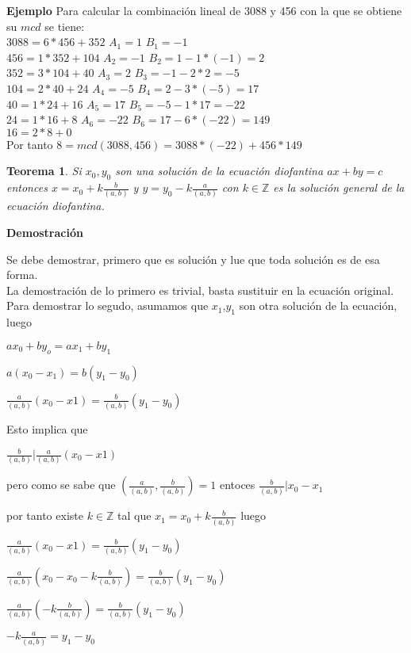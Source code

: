 \documentclass[a4paper,1pt]{report}
\newtheorem*{teo}{Teorema}
\begin{document}
\textbf{Ejemplo}
Para calcular la combinación lineal de 3088 y 456 con la que se obtiene su $mcd$ se tiene:\\
$3088=6*456+352$ $A_1=1$ $B_1=-1$\\
$456=1*352+104$ $A_2=-1$ $B_2=1-1*(-1)=2$\\
$352=3*104+40$ $A_3=2$ $B_3=-1-2*2=-5$\\
$104=2*40+24$ $A_4=-5$ $B_4=2-3*(-5)=17$\\
$40=1*24+16$ $A_5=17$ $B_5=-5-1*17=-22$\\
$24=1*16+8$ $A_6=-22$ $B_6=17-6*(-22)=149$\\
$16=2*8 + 0$\\
Por tanto $8=mcd(3088,456)=3088*(-22)+456*149$

\begin{teo}
 Si $x_0,y_0$ son una solución de la ecuación diofantina $ax+by=c$ entonces 
 $x=x_0+k\frac{b}{(a,b)}$ y $y=y_0-k\frac{a}{(a,b)}$ con $k\in\mathbb{Z}$ es la solución general de la ecuación diofantina.
\end{teo}

\newpage
\textbf{Demostración}

Se debe demostrar, primero que es solución y lue que toda solución es de esa forma.
\\

La demostración de lo primero es trivial, basta sustituir en la ecuación original.
\\

Para demostrar lo segudo, asumamos que $x_1$,$y_1$ son otra solución de la ecuación, luego

$ax_0+by_o=ax_1+by_1$

$a(x_0-x_1)=b(y_1-y_0)$

$\frac{a}{(a,b)}(x_0-x1)=\frac{b}{(a,b)}(y_1-y_0)$

Esto implica que

$\frac{b}{(a,b)}|\frac{a}{(a,b)}(x_0-x1)$

pero como se sabe que $(\frac{a}{(a,b)},\frac{b}{(a,b)})=1$ entoces $\frac{b}{(a,b)}|x_0-x_1$

por tanto existe $k\in\mathbb{Z}$ tal que $x_1=x_0 + k\frac{b}{(a,b)}$ luego

$\frac{a}{(a,b)}(x_0-x1)=\frac{b}{(a,b)}(y_1-y_0)$


$\frac{a}{(a,b)}(x_0- x_0 - k\frac{b}{(a,b)} )=\frac{b}{(a,b)}(y_1-y_0)$

$\frac{a}{(a,b)}(- k\frac{b}{(a,b)} )=\frac{b}{(a,b)}(y_1-y_0)$

$-k\frac{a}{(a,b)}=y_1-y_0$
\end{document}
